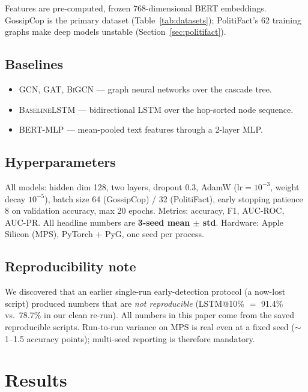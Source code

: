 \documentclass[10pt,twocolumn]{article}
\begin{document}
Features are pre-computed, frozen 768-dimensional BERT embeddings. GossipCop is
the primary dataset (Table~\ref{tab:datasets}); PolitiFact's 62 training graphs
make deep models unstable (Section~\ref{sec:politifact}).

\subsection{Baselines}
\label{sec:baselines}
\begin{itemize}[leftmargin=*,itemsep=2pt]
\item \textsc{GCN}, \textsc{GAT}, \textsc{BiGCN} --- graph neural networks over
the cascade tree.
\item \textsc{BaselineLSTM} --- bidirectional LSTM over the hop-sorted node
sequence.
\item \textsc{BERT-MLP} --- mean-pooled text features through a 2-layer MLP.
\end{itemize}

\subsection{Hyperparameters}
\label{sec:hyper}
All models: hidden dim 128, two layers, dropout 0.3, AdamW ($\mathrm{lr}=10^{-3}$,
weight decay $10^{-5}$), batch size 64 (GossipCop) / 32 (PolitiFact), early
stopping patience 8 on validation accuracy, max 20 epochs. Metrics: accuracy,
F1, AUC-ROC, AUC-PR. All headline numbers are \textbf{3-seed mean $\pm$ std}.
Hardware: Apple Silicon (MPS), PyTorch + PyG, one seed per process.

\subsection{Reproducibility note}
\label{sec:repro}
We discovered that an earlier single-run early-detection protocol (a now-lost
script) produced numbers that are \emph{not reproducible} (LSTM@10\% $=$ 91.4\%
vs.\ 78.7\% in our clean re-run). All numbers in this paper come from the saved
reproducible scripts. Run-to-run variance on MPS is real even at a fixed seed
($\sim$1--1.5 accuracy points); multi-seed reporting is therefore mandatory.

\section{Results}
\label{sec:results}
\end{document}
